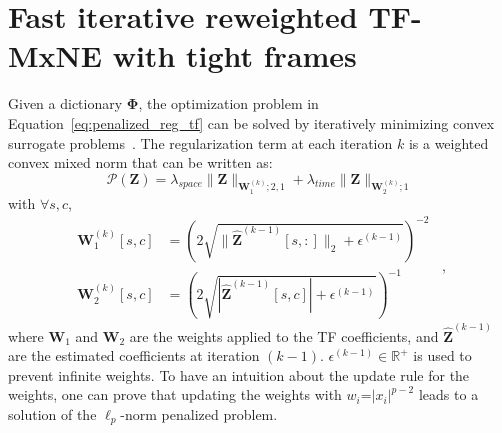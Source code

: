 \section{Fast iterative reweighted TF-MxNE with tight frames}
Given a dictionary $\mathbf{\Phi}$, the optimization problem in Equation~\eqref{eq:penalized_reg_tf} can be solved by iteratively minimizing convex surrogate problems~\cite{irTF-MxNE}. The regularization term at each iteration $k$ is a weighted convex mixed norm that can be written as:
\begin{equation} \label{eq:weights_optim}
    \mathcal{P}(\mathbf{Z}) = \lambda_{space}\|\mathbf{Z}\|_{\mathbf{W}_1^{(k)};2,1} + \lambda_{time}\|\mathbf{Z}\|_{\mathbf{W}_2^{(k)};1}
\end{equation}
with $\forall s,c$,
\begin{equation*}
\begin{aligned}
    \mathbf{W}_1^{(k)}[s,c] &= \left(2\sqrt{\|\hat{\mathbf{Z}}^{(k-1)}[s,:]\|_2 + \epsilon^{(k-1)}}\right)^{-2} \\
    \mathbf{W}_2^{(k)}[s,c] &= \left(2\sqrt{|\hat{\mathbf{Z}}^{(k-1)}[s,c]| + \epsilon^{(k-1)}}\right)^{-1}
\end{aligned} \enspace ,
\end{equation*}
%
where $\mathbf{W}_1$ and $\mathbf{W}_2$ are the weights applied to the TF coefficients, and $\mathbf{\hat{Z}}^{(k-1)}$ are the estimated coefficients at iteration $(k-1)$. $\epsilon^{(k-1)} \in \mathbb{R}^+$ is used to prevent infinite weights. To have an intuition about the update rule for the weights, one can prove that updating the weights with $w_i$=$|x_i|^{p-2}$ leads to a solution of the $\ell_p$-norm penalized problem.\\

